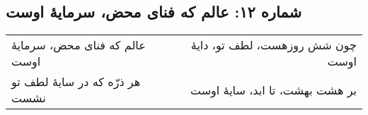 \begin{center}
\section*{شماره ۱۲: عالم که فنای محض، سرمایۀ اوست}
\label{sec:012}
\begin{longtable}{l p{0.5cm} r}
عالم که فنای محض، سرمایهٔ اوست
&&
چون شش روزهست، لطف تو، دایهٔ اوست
\\
هر ذرّه که در سایهٔ لطف تو نشست
&&
بر هشت بهشت، تا ابد، سایهٔ اوست
\\
\end{longtable}
\end{center}
